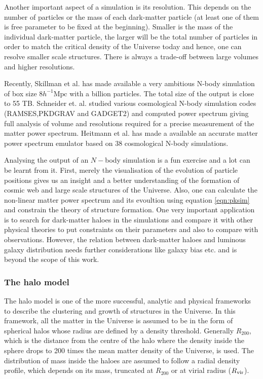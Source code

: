 Another important aspect of a simulation is its resolution. This depends on the number of
particles or the mass of each dark-matter particle (at least one of them is free parameter 
to be fixed at the beginning). Smaller is the mass of the individual dark-matter particle, the
larger will be the total number of particles in order to match the critical density of 
the Universe today and hence, one can resolve smaller scale structures. 
There is always a trade-off between large volumes and higher resolutions. 


Recently, Skillman et al. \cite{2014arXiv1407.2600S} has made available
a very ambitious N-body simulation of box size $8 h^{-1} \mathrm{Mpc}$ with
a billion particles. The total size of the output is close to 55 TB.
Schneider et. al. \cite{2015arXiv150305920S} studied various cosmological
N-body simulation codes (RAMSES,PKDGRAV and GADGET2) and computed power 
spectrum giving full analysis of volume and resolutions required for 
a precise measurement of the matter power spectrum.
Heitmann et al. \cite{2009ApJ...705..156H,2010ApJ...715..104H,2010ApJ...713.1322L,2014ApJ...780..111H} has made a available an accurate matter power spectrum
emulator based on 38 cosmological N-body simulations. 

Analysing the output of an $N-$body simulation is a fun exercise and a lot can be learnt
from it. First, merely the visualisation of the evolution of particle positions gives
us an insight and a better understanding of the formation of cosmic web and large
scale structures of the Universe. 
Also, one can calculate the non-linear matter power spectrum and its evoultion using equation \ref{eqn:pksim} and constrain the theory of structure formation. One very important
application is to search for dark-matter haloes in the simulations and compare
it with other physical theories to put constraints on their parameters and also
to compare with observations. However, the relation between dark-matter haloes
and luminous galaxy distribution needs further considerations like galaxy 
bias etc. and is beyond the scope of this work. 




\subsubsection{The halo model}

The halo model \cite{1977ApJ...217..331M,2000ApJ...543..503M,2000MNRAS.318.1144P,2000MNRAS.318..203S} 
is one of the more successful, analytic and physical frameworks to describe
the clustering and growth of structures in the Universe. In this framework, all the matter
in the Universe is assumed to be in the form of spherical halos whose radius are defined by a 
density threshold. Generally $R_{200}$, which is the distance from the centre of the halo where
the density inside the sphere drops to 200 times the mean matter density of the Universe, is used. 
The  distribution of mass inside the haloes are assumed to follow a radial density 
profile, which depends on its mass, truncated at $R_{200}$ or at virial 
radius ($R_{\rm vir}$).

